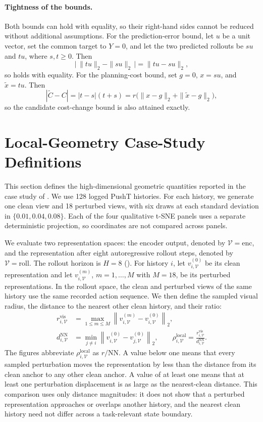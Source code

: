 \documentclass[10pt]{article}
\begin{document}
\paragraph{Tightness of the bounds.}
Both bounds can hold with equality, so their right-hand sides cannot be
reduced without additional assumptions. For the prediction-error bound, let
$u$ be a unit vector, set the common target to $Y=0$, and let the two predicted
rollouts be $su$ and $tu$, where $s,t\geq0$. Then
\[
\bigl|\,\|tu\|_2-\|su\|_2\,\bigr|
=\|tu-su\|_2,
\]
so  holds with equality. For the planning-cost
bound, set $g=0$, $x=su$, and $\tilde x=tu$. Then
\[
|\tilde C-C|
=|t-s|(t+s)
=r\bigl(\|x-g\|_2+\|\tilde x-g\|_2\bigr),
\]
so the candidate cost-change bound is also attained exactly.

\section{Local-Geometry Case-Study Definitions}
\label{sec:appendix-local-geometry}

This section defines the high-dimensional geometric quantities reported in the
case study of . We use 128 logged PushT histories.
For each history, we generate one clean view and 18 perturbed views, with six
draws at each standard deviation in $\{0.01,0.04,0.08\}$. Each of the four
qualitative t-SNE panels uses a separate deterministic projection, so
coordinates are not compared across panels.

We evaluate two representation spaces: the encoder output, denoted by
$\mathcal V=\mathrm{enc}$, and the representation after eight autoregressive
rollout steps, denoted by $\mathcal V=\mathrm{roll}$. The rollout horizon is
$H=8$ (). For history $i$, let
$v_{i,\mathcal V}^{(0)}$ be its clean representation and let
$v_{i,\mathcal V}^{(m)}$, $m=1,\ldots,M$ with $M=18$, be its perturbed
representations. In the rollout space, the clean and perturbed views of the
same history use the same recorded action sequence. We then define the sampled
visual radius, the distance to the nearest other clean history, and their ratio:
\begin{align}
r_{i,\mathcal V}^{\mathrm{vis}}
&=\max_{1\leq m\leq M}
\left\|v_{i,\mathcal V}^{(m)}-v_{i,\mathcal V}^{(0)}\right\|_2,
\nonumber\\
d_{i,\mathcal V}^{\mathrm{NN}}
&=\min_{j\neq i}
\left\|v_{i,\mathcal V}^{(0)}-v_{j,\mathcal V}^{(0)}\right\|_2,
\qquad
\rho_{i,\mathcal V}^{\mathrm{local}}
=\frac{r_{i,\mathcal V}^{\mathrm{vis}}}
{d_{i,\mathcal V}^{\mathrm{NN}}}.
\label{eq:local-radius-spacing}
\end{align}
The figures abbreviate $\rho_{i,\mathcal V}^{\mathrm{local}}$ as
$r/\mathrm{NN}$. A value below one means that every sampled perturbation moves
the representation by less than the distance from its clean anchor to any
other clean anchor. A value of at least one means that at least one
perturbation displacement is as large as the nearest-clean distance. This
comparison uses only distance magnitudes: it does not show that a perturbed
representation approaches or overlaps another history, and the nearest clean
history need not differ across a task-relevant state boundary.
\end{document}

